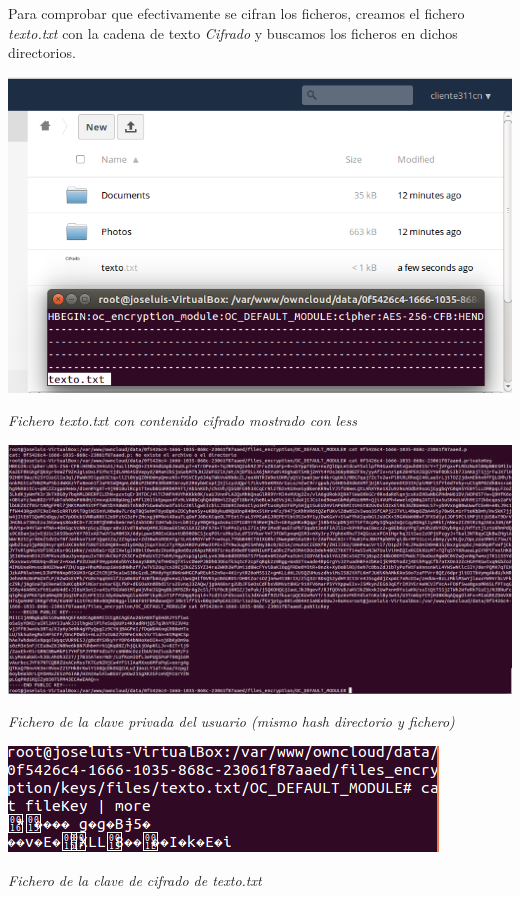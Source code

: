 \documentclass[]{article}
\begin{document}
Para comprobar que efectivamente se cifran los ficheros, creamos el fichero \textit{texto.txt} con la cadena de texto \textit{Cifrado} y buscamos los ficheros en dichos directorios.

\begin{center}
	\includegraphics[scale=0.65]{images/owncloud/1.png}
	
	\textit{Fichero texto.txt con contenido cifrado mostrado con less}
\end{center}

\begin{center}
	\includegraphics[scale=0.33]{images/owncloud/2.png}
	
	\textit{Fichero de la clave privada del usuario (mismo hash directorio y fichero)}
\end{center}


\begin{center}
	\includegraphics[scale=0.65]{images/owncloud/3.png}
	
	\textit{Fichero de la clave de cifrado de texto.txt}
\end{center}
\end{document}
